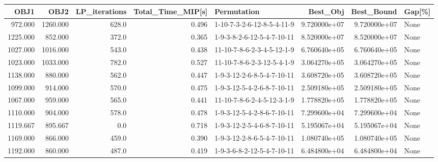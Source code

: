 \begin{tabular}{rrrrlrrl}
\toprule
     OBJ1 &      OBJ2 &  LP\_iterations &  Total\_Time\_MIP[s] &                 Permutation &      Best\_Obj &    Best\_Bound & Gap[\%] \\
\midrule
  972.000 &  1260.000 &          628.0 &              0.496 &  1-10-7-3-2-6-12-8-5-4-11-9 &  9.720000e+07 &  9.720000e+07 &   None \\
 1225.000 &   852.000 &          372.0 &              0.365 &  1-9-3-8-2-6-12-5-4-7-10-11 &  8.520000e+07 &  8.520000e+07 &   None \\
 1027.000 &  1016.000 &          543.0 &              0.438 &  11-10-7-8-6-2-3-4-5-12-1-9 &  6.760640e+05 &  6.760640e+05 &   None \\
 1023.000 &  1033.000 &          782.0 &              0.527 &  11-10-7-8-6-2-3-12-5-4-1-9 &  3.064270e+05 &  3.064270e+05 &   None \\
 1138.000 &   880.000 &          562.0 &              0.447 &  1-9-3-12-2-6-8-5-4-7-10-11 &  3.608720e+05 &  3.608720e+05 &   None \\
 1099.000 &   914.000 &          570.0 &              0.475 &  1-9-3-12-5-4-2-6-8-7-10-11 &  2.509180e+05 &  2.509180e+05 &   None \\
 1067.000 &   959.000 &          565.0 &              0.441 &  11-10-7-8-6-2-4-5-12-3-1-9 &  1.778820e+05 &  1.778820e+05 &   None \\
 1110.000 &   904.000 &          578.0 &              0.478 &  1-9-3-12-5-4-2-8-6-7-10-11 &  7.299600e+04 &  7.299600e+04 &   None \\
 1119.667 &   895.667 &            0.0 &              0.718 &  1-9-3-12-2-5-4-6-8-7-10-11 &  5.195067e+04 &  5.195067e+04 &   None \\
 1169.000 &   866.000 &          459.0 &              0.390 &  1-9-3-12-2-8-6-5-4-7-10-11 &  1.080740e+05 &  1.080740e+05 &   None \\
 1192.000 &   860.000 &          487.0 &              0.419 &  1-9-3-6-8-2-12-5-4-7-10-11 &  6.484800e+04 &  6.484800e+04 &   None \\
\bottomrule
\end{tabular}
